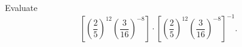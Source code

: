 Evaluate
\[
\left[\left(\dfrac{2}{5}\right)^{12}\left(\dfrac{3}{16}\right)^{-8}\right]\cdot\left[\left(\dfrac{2}{5}\right)^{12}\left(\dfrac{3}{16}\right)^{-8}\right]^{-1}.
\]
